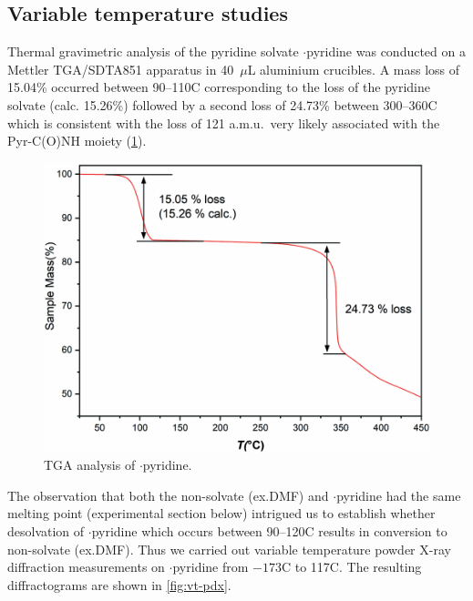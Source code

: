 \begin{refsection}
    \subsection{Variable temperature studies}
    Thermal gravimetric analysis of the pyridine solvate $\cdot$pyridine was conducted on a Mettler TGA/SDTA851 apparatus in 40~$\mu$L aluminium crucibles.
    A mass loss of 15.04\% occurred between 90--110\degree{}C corresponding to the loss of the pyridine solvate (calc. 15.26\%) followed by a second loss of 24.73\% between 300--360\degree{}C which is consistent with the loss of 121 a.m.u.\ very likely associated with the Pyr-C(O)NH moiety (\cref{fig:tga}).
    
    \begin{figure}
        \centering
        \includegraphics[width=0.8\linewidth]{Figures/tga.pdf}
        \caption{TGA analysis of $\cdot$pyridine.}\label{fig:tga}
    \end{figure}
    
    The observation that both the non-solvate (ex.DMF) and $\cdot$pyridine had the same melting point (experimental section below) intrigued us to establish whether desolvation of $\cdot$pyridine which occurs between 90--120\degree{}C results in conversion to non-solvate (ex.DMF).
    Thus we carried out variable temperature powder X-ray diffraction measurements on $\cdot$pyridine from $-173$\degree{}C to 117\degree{}C.
    The resulting diffractograms are shown in \cref{fig:vt-pdx}.
    

\end{refsection}
